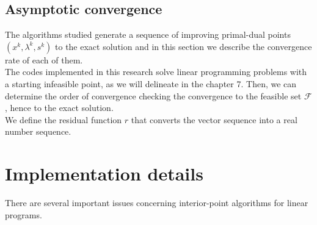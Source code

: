 \documentclass[a4paper,10 pt,titlepage,twoside]{book}
\theoremstyle{plain}
\theoremstyle{definition}
\theoremstyle{remark}
\begin{document}

\newpage
\section{Asymptotic convergence}
The algorithms studied generate a sequence of improving primal-dual points $(x^{k},\lambda^{k}, s^{k})$ to the exact solution and in this section we describe the convergence rate of each of them. \\
The codes implemented in this research solve linear programming problems with a starting infeasible point, as we will delineate in the chapter 7. Then, we can determine the order of convergence checking the convergence to the feasible set $\mathcal{F}$, hence to the exact solution.\\
We define the residual function $r$ that converts the vector sequence into a real number sequence.
\chapter{Implementation details}
There are several important issues concerning interior-point algorithms
for linear programs.
\end{document}
